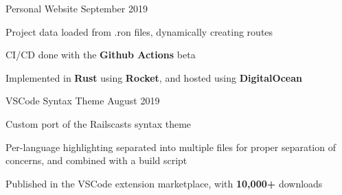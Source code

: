 

\begin{cventries}
    \cventry
    {Personal Website} %
    {} %
    {}{September 2019}{
        \begin{cvitems} %
            \item {Project data loaded from .ron files, dynamically creating routes}
            \item {CI/CD done with the \textbf{Github Actions} beta}
            \item {Implemented in \textbf{Rust} using \textbf{Rocket}, and hosted using \textbf{DigitalOcean}}
        \end{cvitems}
    }

    \cventry
    {VSCode Syntax Theme} %
    {} %
    {}{August 2019}{
        \begin{cvitems} %
            \item {Custom port of the Railscasts syntax theme}
            \item {Per-language highlighting separated into multiple files for proper separation of concerns, and combined with a build script}
            \item {Published in the VSCode extension marketplace, with \textbf{10,000+} downloads}
        \end{cvitems}
    }



\end{cventries}
